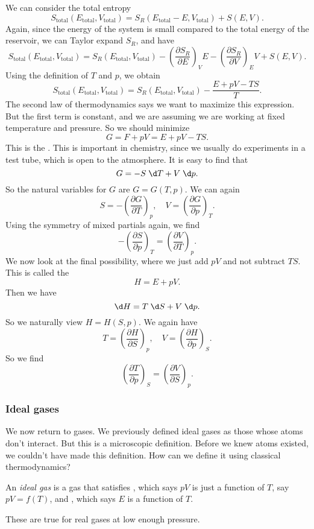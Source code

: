 \documentclass[a4paper]{article}
\begin{document}
We can consider the total entropy
\[
  S_{\mathrm{total}}(E_{\mathrm{total}}, V_{\mathrm{total}}) = S_R(E_{\mathrm{total}} - E, V_{\mathrm{total}}) + S(E, V).
\]
Again, since the energy of the system is small compared to the total energy of the reservoir, we can Taylor expand $S_R$, and have
\[
  S_{\mathrm{total}}(E_{\mathrm{total}}, V_{\mathrm{total}}) = S_R(E_{\mathrm{total}}, V_{\mathrm{total}}) - \left(\frac{\partial S_R}{\partial E}\right)_V E - \left(\frac{\partial S_R}{\partial V}\right)_E V + S(E, V).
\]
Using the definition of $T$ and $p$, we obtain
\[
  S_{\mathrm{total}}(E_{\mathrm{total}}, V_{\mathrm{total}}) = S_R(E_{\mathrm{total}}, V_{\mathrm{total}}) - \frac{E + pV - TS}{T}.
\]
The second law of thermodynamics says we want to maximize this expression. But the first term is constant, and we are assuming we are working at fixed temperature and pressure. So we should minimize
\[
  G = F + pV = E + pV - TS.
\]
This is the . This is important in chemistry, since we usually do experiments in a test tube, which is open to the atmosphere. It is easy to find that
\[
  G = - S \;\d T + V \;\d p.
\]
So the natural variables for $G$ are $G = G(T, p)$. We can again
\[
  S = -\left(\frac{\partial G}{\partial T}\right)_p,\quad V = \left(\frac{\partial G}{\partial p}\right)_T.
\]
Using the symmetry of mixed partials again, we find
\[
  - \left(\frac{\partial S}{\partial p}\right)_T = \left(\frac{\partial V}{\partial T}\right)_p.
\]
We now look at the final possibility, where we just add $pV$ and not subtract $TS$. This is called the 
\[
  H = E + pV.
\]
Then we have
\[
  \d H = T\;\d S + V \;\d p.
\]
So we naturally view $H = H(S, p)$. We again have
\[
  T = \left(\frac{\partial H}{\partial S}\right)_p,\quad V = \left(\frac{\partial H}{\partial p}\right)_S.
\]
So we find
\[
  \left(\frac{\partial T}{\partial p}\right)_S = \left(\frac{\partial V}{\partial S}\right)_p.
\]
\subsubsection*{Ideal gases}
We now return to gases. We previously defined ideal gases as those whose atoms don't interact. But this is a microscopic definition. Before we knew atoms existed, we couldn't have made this definition. How can we define it using classical thermodynamics?

\begin{defi}
  An \emph{ideal gas} is a gas that satisfies , which says $pV$ is just a function of $T$, say $pV = f(T)$, and , which says $E$ is a function of $T$.
\end{defi}
These are true for real gases at low enough pressure.
\end{document}
